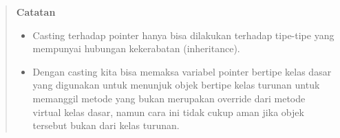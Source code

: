 \begin{quotation}
 {\LARGE {}}  \textbf{Catatan} 
	\begin{itemize}
		\item[\ding{45}] Casting terhadap pointer hanya bisa dilakukan terhadap tipe-tipe yang
		mempunyai hubungan kekerabatan (inheritance).
		\item[\ding{45}] Dengan casting kita bisa memaksa variabel pointer bertipe kelas dasar yang
		digunakan untuk menunjuk objek bertipe kelas turunan untuk memanggil
		metode yang bukan merupakan override dari metode virtual kelas dasar,
		namun cara ini tidak cukup aman jika objek tersebut bukan dari kelas
		turunan.
	\end{itemize}
\end{quotation}


